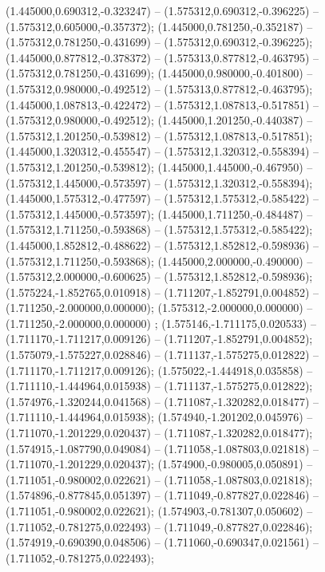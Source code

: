  (1.445000,0.690312,-0.323247) -- (1.575312,0.690312,-0.396225) -- (1.575312,0.605000,-0.357372);
 (1.445000,0.781250,-0.352187) -- (1.575312,0.781250,-0.431699) -- (1.575312,0.690312,-0.396225);
 (1.445000,0.877812,-0.378372) -- (1.575313,0.877812,-0.463795) -- (1.575312,0.781250,-0.431699);
 (1.445000,0.980000,-0.401800) -- (1.575312,0.980000,-0.492512) -- (1.575313,0.877812,-0.463795);
 (1.445000,1.087813,-0.422472) -- (1.575312,1.087813,-0.517851) -- (1.575312,0.980000,-0.492512);
 (1.445000,1.201250,-0.440387) -- (1.575312,1.201250,-0.539812) -- (1.575312,1.087813,-0.517851);
 (1.445000,1.320312,-0.455547) -- (1.575312,1.320312,-0.558394) -- (1.575312,1.201250,-0.539812);
 (1.445000,1.445000,-0.467950) -- (1.575312,1.445000,-0.573597) -- (1.575312,1.320312,-0.558394);
 (1.445000,1.575312,-0.477597) -- (1.575312,1.575312,-0.585422) -- (1.575312,1.445000,-0.573597);
 (1.445000,1.711250,-0.484487) -- (1.575312,1.711250,-0.593868) -- (1.575312,1.575312,-0.585422);
 (1.445000,1.852812,-0.488622) -- (1.575312,1.852812,-0.598936) -- (1.575312,1.711250,-0.593868);
 (1.445000,2.000000,-0.490000) -- (1.575312,2.000000,-0.600625) -- (1.575312,1.852812,-0.598936);
 (1.575224,-1.852765,0.010918) -- (1.711207,-1.852791,0.004852) -- (1.711250,-2.000000,0.000000);
 (1.575312,-2.000000,0.000000) -- (1.711250,-2.000000,0.000000) ;
 (1.575146,-1.711175,0.020533) -- (1.711170,-1.711217,0.009126) -- (1.711207,-1.852791,0.004852);
 (1.575079,-1.575227,0.028846) -- (1.711137,-1.575275,0.012822) -- (1.711170,-1.711217,0.009126);
 (1.575022,-1.444918,0.035858) -- (1.711110,-1.444964,0.015938) -- (1.711137,-1.575275,0.012822);
 (1.574976,-1.320244,0.041568) -- (1.711087,-1.320282,0.018477) -- (1.711110,-1.444964,0.015938);
 (1.574940,-1.201202,0.045976) -- (1.711070,-1.201229,0.020437) -- (1.711087,-1.320282,0.018477);
 (1.574915,-1.087790,0.049084) -- (1.711058,-1.087803,0.021818) -- (1.711070,-1.201229,0.020437);
 (1.574900,-0.980005,0.050891) -- (1.711051,-0.980002,0.022621) -- (1.711058,-1.087803,0.021818);
 (1.574896,-0.877845,0.051397) -- (1.711049,-0.877827,0.022846) -- (1.711051,-0.980002,0.022621);
 (1.574903,-0.781307,0.050602) -- (1.711052,-0.781275,0.022493) -- (1.711049,-0.877827,0.022846);
 (1.574919,-0.690390,0.048506) -- (1.711060,-0.690347,0.021561) -- (1.711052,-0.781275,0.022493);
